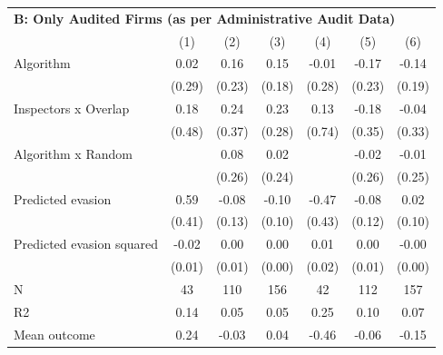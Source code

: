\begin{tabular}{lccc|ccc}
\midrule \multicolumn{7}{l}{\textbf{B: Only Audited Firms (as per Administrative Audit Data)}} \\ \multicolumn{1}{l}{} & (1) & (2) & (3) & (4) & (5) & (6) \\ \midrule

Algorithm   &        0.02         &        0.16         &        0.15         &       -0.01         &       -0.17         &       -0.14         \\
            &      (0.29)         &      (0.23)         &      (0.18)         &      (0.28)         &      (0.23)         &      (0.19)         \\
\addlinespace
Inspectors x Overlap&        0.18         &        0.24         &        0.23         &        0.13         &       -0.18         &       -0.04         \\
            &      (0.48)         &      (0.37)         &      (0.28)         &      (0.74)         &      (0.35)         &      (0.33)         \\
\addlinespace
Algorithm x Random&                     &        0.08         &        0.02         &                     &       -0.02         &       -0.01         \\
            &                     &      (0.26)         &      (0.24)         &                     &      (0.26)         &      (0.25)         \\
\addlinespace
Predicted evasion&        0.59         &       -0.08         &       -0.10         &       -0.47         &       -0.08         &        0.02         \\
            &      (0.41)         &      (0.13)         &      (0.10)         &      (0.43)         &      (0.12)         &      (0.10)         \\
\addlinespace
Predicted evasion squared&       -0.02         &        0.00         &        0.00         &        0.01         &        0.00         &       -0.00         \\
            &      (0.01)         &      (0.01)         &      (0.00)         &      (0.02)         &      (0.01)         &      (0.00)         \\
\midrule
N           &          43         &         110         &         156         &          42         &         112         &         157         \\
R2          &        0.14         &        0.05         &        0.05         &        0.25         &        0.10         &        0.07         \\
Mean outcome&        0.24         &       -0.03         &        0.04         &       -0.46         &       -0.06         &       -0.15         \\
\bottomrule \end{tabular}
